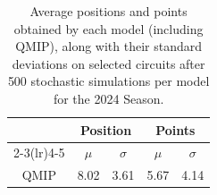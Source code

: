 \begin{table}[H]
\centering
\begin{tabular}{ccccc}
\toprule
\multicolumn{1}{l}{}               & \multicolumn{2}{c}{Position}   & \multicolumn{2}{c}{Points} \\ \cmidrule(lr){2-3}\cmidrule(lr){4-5}
\multicolumn{1}{c}{Model}          &    $\mu$ & $\sigma$ &   $\mu$  & $\sigma$ \\ \midrule
\multicolumn{1}{c}{QMIP          } &     8.02  &     3.61  &     5.67  &     4.14  \\
\bottomrule
\end{tabular}
\caption{Average positions and points obtained by each model (including QMIP), along with their standard deviations on selected circuits after 500 stochastic simulations per model for the 2024 Season.}
\label{tab:tab_qmip_vs_drl_stochastic_2024}
\end{table}